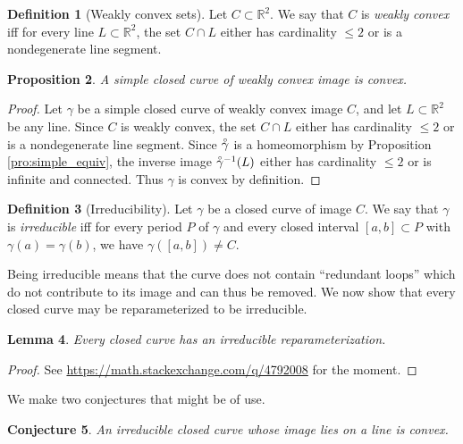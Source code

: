 \documentclass{amsart}
\newtheorem{proposition}{Proposition}[section]
\newtheorem{lemma}[proposition]{Lemma}
\newtheorem{conjecture}[proposition]{Conjecture}
\theoremstyle{definition}
\newtheorem{definition}[proposition]{Definition}
\theoremstyle{remark}
\newcommand{\lring}[1]{\accentset{\circ}{#1}}
\begin{document}
\begin{definition}[Weakly convex sets]
    Let $C\subset\mathbb{R}^2$. We say that $C$ is \emph{weakly convex}
    iff for every line $L\subset\mathbb{R}^2$, the set $C\cap L$
    either has cardinality $\le2$ or is a nondegenerate line segment.
\end{definition}

\begin{proposition}
    \label{pro:simple_convex}
    A simple closed curve of weakly convex image is convex.
\end{proposition}

\begin{proof}
    Let $\gamma$ be a simple closed curve of weakly convex image $C$,
    and let $L\subset\mathbb{R}^2$ be any line.
    Since $C$ is weakly convex, the set $C\cap L$
    either has cardinality $\le2$ or is a nondegenerate line segment.
    Since $\lring{\gamma}$ is a homeomorphism by Proposition
    \ref{pro:simple_equiv}, the inverse image $\lring{\gamma}^{-1}(L)$
    either has cardinality $\le2$ or is infinite and connected.
    Thus $\gamma$ is convex by definition.
\end{proof}

\begin{definition}[Irreducibility]
    Let $\gamma$ be a closed curve of image $C$.
    We say that $\gamma$ is \emph{irreducible} iff for every period
    $P$ of $\gamma$ and every closed interval $[a,b]\subset P$
    with $\gamma(a)=\gamma(b)$, we have
    $\gamma([a,b])\ne C$.
\end{definition}

Being irreducible means that the curve does not contain
``redundant loops'' which do not contribute to its image
and can thus be removed. We now show that every closed curve
may be reparameterized to be irreducible.

\begin{lemma}
    \label{lem:irr_exists}
    Every closed curve has an irreducible reparameterization.
\end{lemma}

\begin{proof}
    See \url{https://math.stackexchange.com/q/4792008} for the moment.
\end{proof}

We make two conjectures that might be of use.

\begin{conjecture}
    \label{con:irr_linear_convex}
    An irreducible closed curve whose image lies on a line is convex.
\end{conjecture}
\end{document}
